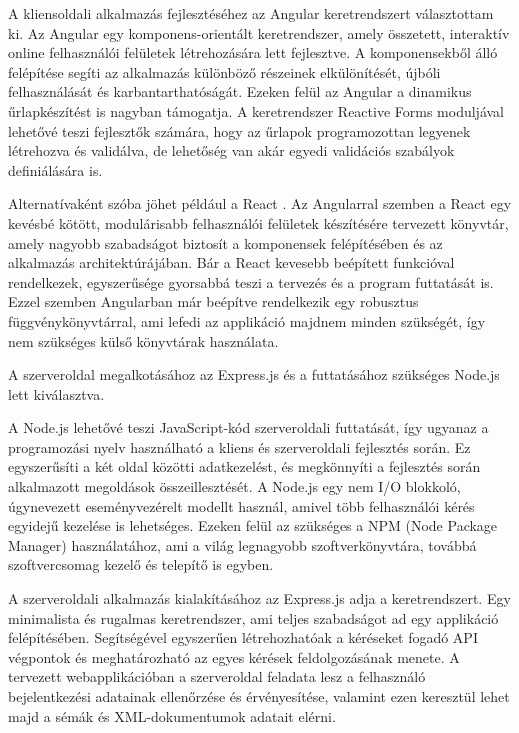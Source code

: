 
A kliensoldali alkalmazás fejlesztéséhez az Angular keretrendszert választottam ki. Az Angular egy komponens-orientált keretrendszer, amely összetett, interaktív online felhasználói felületek létrehozására lett fejlesztve. A komponensekből álló felépítése segíti az alkalmazás különböző részeinek elkülönítését, újbóli felhasználását és karbantarthatóságát. Ezeken felül az Angular a dinamikus űrlapkészítést is nagyban támogatja. A keretrendszer Reactive Forms moduljával lehetővé teszi fejlesztők számára, hogy az űrlapok programozottan legyenek létrehozva és validálva, de lehetőség van akár egyedi validációs szabályok definiálására is.

Alternatívaként szóba jöhet például a React \cite{react}. Az Angularral szemben a React egy kevésbé kötött, modulárisabb felhasználói felületek készítésére tervezett könyvtár, amely nagyobb szabadságot biztosít a komponensek felépítésében és az alkalmazás architektúrájában. Bár a React kevesebb beépített funkcióval rendelkezek, egyszerűsége gyorsabbá teszi a tervezés és a program futtatását is. Ezzel szemben Angularban már beépítve rendelkezik egy robusztus függvénykönyvtárral, ami lefedi az applikáció majdnem minden szükségét, így nem szükséges külső könyvtárak használata.


A szerveroldal megalkotásához az Express.js és a futtatásához szükséges Node.js lett kiválasztva. 

A Node.js lehetővé teszi JavaScript-kód szerveroldali futtatását, így ugyanaz a programozási nyelv használható a kliens és szerveroldali fejlesztés során. Ez egyszerűsíti a két oldal közötti adatkezelést, és megkönnyíti a fejlesztés során alkalmazott megoldások összeillesztését. A Node.js egy nem I/O blokkoló, úgynevezett eseményvezérelt modellt használ, amivel több felhasználói kérés egyidejű kezelése is lehetséges. Ezeken felül az szükséges a NPM (Node Package Manager) használatához, ami a világ legnagyobb szoftverkönyvtára, továbbá szoftvercsomag kezelő és telepítő is egyben. 

A szerveroldali alkalmazás kialakításához az Express.js adja a keretrendszert. Egy minimalista és rugalmas keretrendszer, ami teljes szabadságot ad egy applikáció felépítésében. Segítségével egyszerűen létrehozhatóak a kéréseket fogadó API végpontok és meghatározható az egyes kérések feldolgozásának menete. A tervezett webapplikációban a szerveroldal feladata lesz a felhasználó bejelentkezési adatainak ellenőrzése és érvényesítése, valamint ezen keresztül lehet majd a sémák és XML-dokumentumok adatait elérni.

